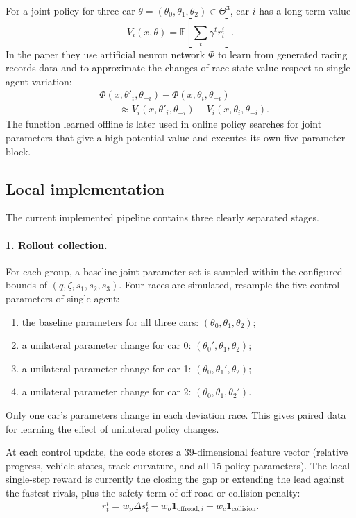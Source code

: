 \documentclass[11pt]{article}
\begin{document}
For a joint policy for three car $\theta=(\theta_0,\theta_1,\theta_2) \in \Theta^3$, car $i$ has a
long-term value
\[
  V_i(x,\theta)=\mathbb E\left[\sum_t\gamma^t r^i_t\right].
\]
In the paper they use artificial neuron network $\Phi$ to learn from generated racing records data and to approximate the changes of race state value respect to single agent variation:
\[
\begin{split}
  &\Phi(x,\theta'_i,\theta_{-i})-\Phi(x,\theta_i,\theta_{-i})\\
  &\qquad\approx
  V_i(x,\theta'_i,\theta_{-i})-V_i(x,\theta_i,\theta_{-i}).
\end{split}
\]
The function learned offline is later used in online policy searches for joint
parameters that give a high potential value and executes its own five-parameter
block.


\subsection{Local implementation}

The current implemented pipeline contains three
clearly separated stages.

\paragraph{1. Rollout collection.}
For each group, a baseline joint parameter set is sampled within the configured bounds of $(q,\zeta,s_1,s_2,s_3)$. Four races are simulated, resample the five control parameters of single agent:
\begin{enumerate}
  \item the baseline parameters for all three cars: $(\theta_0,\theta_1,\theta_2)$;
  \item a unilateral parameter change for car 0: $(\theta_0',\theta_1,\theta_2)$;
  \item a unilateral parameter change for car 1: $(\theta_0,\theta_1',\theta_2)$;
  \item a unilateral parameter change for car 2: $(\theta_0,\theta_1,\theta_2')$.
\end{enumerate}
Only one car's parameters change in each deviation race. This gives paired data
for learning the effect of unilateral policy changes.

At each control update, the code stores a 39-dimensional feature vector (relative progress, vehicle states, track curvature, and all 15 policy
parameters). The local single-step reward is currently the closing the gap or extending the lead against the fastest rivals, plus the safety term of off-road or collision penalty:
\[
  r^i_t=w_p\Delta s^i_t
  -w_o\mathbf{1}_{\mathrm{offroad},i}
  -w_c\mathbf{1}_{\mathrm{collision}}.
\]
\end{document}
